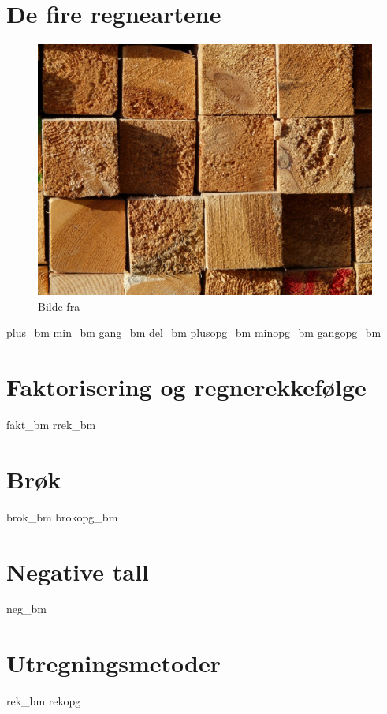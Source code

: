 \chapter{De fire regneartene \label{Rekneartane}}
\begin{figure}
	\centering
	\includegraphics[scale=0.38]{wood} \\
	{\footnotesize Bilde fra } 
\end{figure}
\newpage
{plus_bm}
{min_bm}
{gang_bm}
{del_bm}
\opgt
{plusopg_bm}
{minopg_bm}
{gangopg_bm}

\chapter{Faktorisering og regnerekkefølge}
\newpage
{fakt_bm}
{rrek_bm}

\chapter{Brøk \label{Brok}} 
\newpage
{brok_bm}
\newpage
{brokopg_bm}

\chapter{Negative tall \label{Negtal}}
\newpage
{neg_bm}

\chapter{Utregningsmetoder \label{Utrekning}}
\newpage
{rek_bm}
\newpage
{rekopg}


